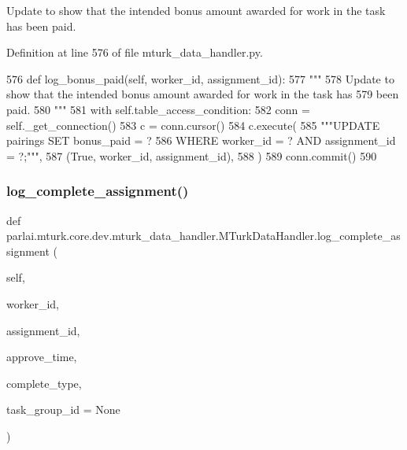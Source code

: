 \begin{DoxyVerb}Update to show that the intended bonus amount awarded for work in the task has
been paid.
\end{DoxyVerb}
 

Definition at line 576 of file mturk\+\_\+data\+\_\+handler.\+py.


\begin{DoxyCode}
576     \textcolor{keyword}{def }log\_bonus\_paid(self, worker\_id, assignment\_id):
577         \textcolor{stringliteral}{"""}
578 \textcolor{stringliteral}{        Update to show that the intended bonus amount awarded for work in the task has}
579 \textcolor{stringliteral}{        been paid.}
580 \textcolor{stringliteral}{        """}
581         with self.table\_access\_condition:
582             conn = self.\_get\_connection()
583             c = conn.cursor()
584             c.execute(
585                 \textcolor{stringliteral}{"""UPDATE pairings SET bonus\_paid = ?}
586 \textcolor{stringliteral}{                         WHERE worker\_id = ? AND assignment\_id = ?;"""},
587                 (\textcolor{keyword}{True}, worker\_id, assignment\_id),
588             )
589             conn.commit()
590 
\end{DoxyCode}
\mbox{\label{classparlai_1_1mturk_1_1core_1_1dev_1_1mturk__data__handler_1_1MTurkDataHandler_a07f6dfb250fe119f1fdd44c58e6c05aa}} 
\subsubsection{\texorpdfstring{log\+\_\+complete\+\_\+assignment()}{log\_complete\_assignment()}}
{\footnotesize\ttfamily def parlai.\+mturk.\+core.\+dev.\+mturk\+\_\+data\+\_\+handler.\+M\+Turk\+Data\+Handler.\+log\+\_\+complete\+\_\+assignment (\begin{DoxyParamCaption}\item[{}]{self,  }\item[{}]{worker\+\_\+id,  }\item[{}]{assignment\+\_\+id,  }\item[{}]{approve\+\_\+time,  }\item[{}]{complete\+\_\+type,  }\item[{}]{task\+\_\+group\+\_\+id = {\ttfamily None} }\end{DoxyParamCaption})}


